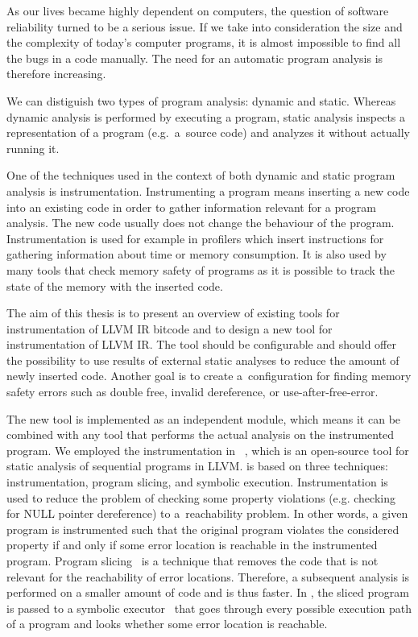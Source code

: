 As our lives became highly dependent on computers, the question of software
reliability turned to be a serious issue. If we take into consideration the
size and the complexity of today's computer programs, it is almost impossible
to find all the bugs in a code manually. The need for an automatic program
analysis is therefore increasing.

We can distiguish two types of program analysis: dynamic and static. Whereas
dynamic analysis is performed by executing a program, static analysis
inspects a representation of a program (e.g.~a~source code) and analyzes it
without actually running it.

One of the techniques used in the context of both dynamic and static program
analysis is instrumentation. Instrumenting a program means inserting a new code
into an existing code in order to gather information relevant for a program
analysis. The new code usually does not change the behaviour of the program.
Instrumentation is used for example in profilers which insert instructions for
gathering information about time or memory consumption. It is also used by many
tools that check memory safety of programs as it is possible to track the state
of the memory with the inserted code.

The aim of this thesis is to present an overview of existing tools for
instrumentation of LLVM IR bitcode and to design a new tool for
instrumentation of LLVM IR. The tool should be configurable and should offer the
possibility to use results of external static analyses to reduce the amount of
newly inserted code. Another goal is to create a~configuration for finding
memory safety errors such as double free, invalid dereference, or
use-after-free-error.

The new tool is implemented as an independent module, which means it can be
combined with any tool that performs the actual analysis on the instrumented
program. We employed the instrumentation in \symbiotic~\cite{Symbiotic}, which
is an open-source tool for static analysis of sequential programs in LLVM.
\symbiotic is based on three techniques: instrumentation, program slicing, and
symbolic execution. Instrumentation is used to reduce the problem of checking
some property violations (e.g. checking for NULL pointer dereference) to
a~reachability problem. In other words, a given program is instrumented such
that the original program violates the considered property if and only if some
error location is reachable in the instrumented program. Program
slicing~\cite{weiser} is a technique that removes the code that is not relevant
for the reachability of error locations. Therefore, a subsequent analysis is
performed on a smaller amount of code and is thus faster. In \symbiotic,
the sliced program is passed to a symbolic executor~\cite{King} that goes
through every possible execution path of a program and looks whether some
error location is reachable.

